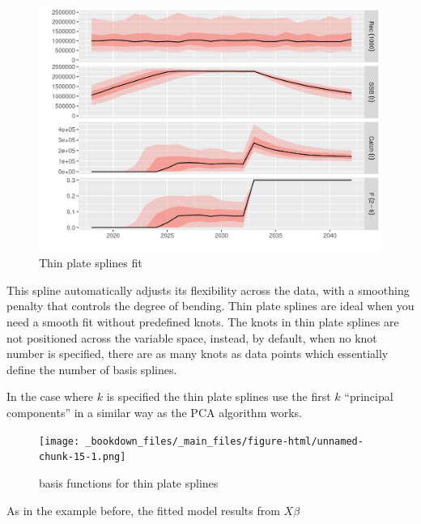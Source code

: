 \documentclass[
]{book}
\begin{document}
\begin{figure}
\centering
\includegraphics{_bookdown_files/_main_files/figure-html/unnamed-chunk-14-1.png}
\caption{\label{fig:unnamed-chunk-14}Thin plate splines fit}
\end{figure}

This spline automatically adjusts its flexibility across the data, with a smoothing penalty that controls the degree of bending. Thin plate splines are ideal when you need a smooth fit without predefined knots. The knots in thin plate splines are not positioned across the variable space, instead, by default, when no knot number is specified, there are as many knots as data points which essentially define the number of basis splines.

In the case where \(k\) is specified the thin plate splines use the first \(k\) ``principal components'' in a similar way as the PCA algorithm works.

\begin{figure}
\centering
\texttt{[image: \_bookdown\_files/\_main\_files/figure-html/unnamed-chunk-15-1.png]}
\caption{\label{fig:unnamed-chunk-15}basis functions for thin plate splines}
\end{figure}

As in the example before, the fitted model results from \(X\beta\)
\end{document}
